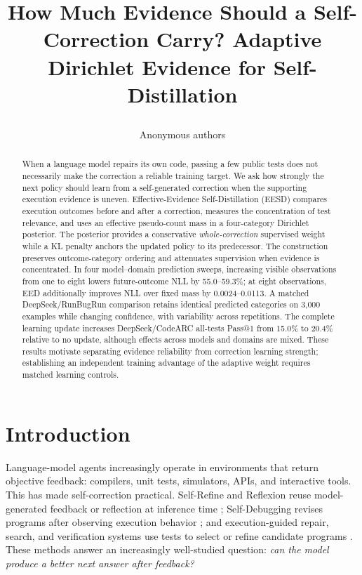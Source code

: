\documentclass{article}
\title{\raggedright How Much Evidence Should a Self-Correction Carry? Adaptive Dirichlet Evidence for Self-Distillation}
\author{Anonymous authors}
\date{}
\newcommand{\method}{\textsc{EESD}\xspace}
\begin{document}
\maketitle



\begin{abstract}
When a language model repairs its own code, passing a few public tests does not necessarily make the correction a reliable training target. We ask how strongly the next policy should learn from a self-generated correction when the supporting execution evidence is uneven. Effective-Evidence Self-Distillation (\method) compares execution outcomes before and after a correction, measures the concentration of test relevance, and uses an effective pseudo-count mass in a four-category Dirichlet posterior. The posterior provides a conservative \emph{whole-correction} supervised weight while a KL penalty anchors the updated policy to its predecessor. The construction preserves outcome-category ordering and attenuates supervision when evidence is concentrated. In four model--domain prediction sweeps, increasing visible observations from one to eight lowers future-outcome NLL by 55.0--59.3\%; at eight observations, EED additionally improves NLL over fixed mass by 0.0024--0.0113. A matched DeepSeek/RunBugRun comparison retains identical predicted categories on 3,000 examples while changing confidence, with variability across repetitions. The complete learning update increases DeepSeek/CodeARC all-tests Pass@1 from 15.0\% to 20.4\% relative to no update, although effects across models and domains are mixed. These results motivate separating evidence reliability from correction learning strength; establishing an independent training advantage of the adaptive weight requires matched learning controls.
\end{abstract}





\section{Introduction}

Language-model agents increasingly operate in environments that return objective feedback: compilers, unit tests, simulators, APIs, and interactive tools. This has made self-correction practical. Self-Refine and Reflexion reuse model-generated feedback or reflection at inference time \citep{madaan2023selfrefine,shinn2023reflexion}; Self-Debugging revises programs after observing execution behavior \citep{chen2024selfdebug}; and execution-guided repair, search, and verification systems use tests to select or refine candidate programs \citep{ni2023lever,tang2024rex,li2025codeprm,li2025sstar,tao2026execcritic}. These methods answer an increasingly well-studied question: \emph{can the model produce a better next answer after feedback?}
\end{document}

